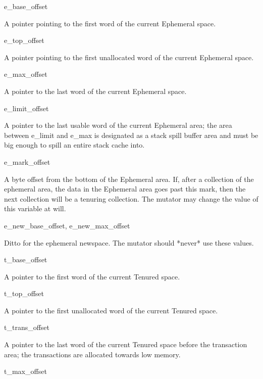 \begin{description}

\item {\sc e\_base\_offset}

A pointer pointing to the first word of the current Ephemeral space.

\item {\sc e\_top\_offset}

A pointer pointing to the first unallocated word of the
current Ephemeral space.

\item {\sc e\_max\_offset}

A pointer to the last word of the current Ephemeral space.

\item {\sc e\_limit\_offset}

A pointer to the last usable word of the current Ephemeral area; the area
between e\_limit and e\_max is designated as a stack spill buffer area and
must be big enough to spill an entire stack cache into.

\item {\sc e\_mark\_offset}

A byte offset from the bottom of the Ephemeral area. If, after a collection
of the ephemeral area, the data in the Ephemeral area goes past this mark,
then the next collection will be a tenuring collection. The mutator may
change the value of this variable at will.

\item {\sc e\_new\_base\_offset, e\_new\_max\_offset }

Ditto for the ephemeral newspace. The mutator should *never* use these values.

\item {\sc t\_base\_offset}

A pointer to the first word of the current Tenured space.

\item {\sc t\_top\_offset}

A pointer to the first unallocated word of the current Tenured space.

\item {\sc t\_trans\_offset}

A pointer to the last word of the current Tenured space
before the transaction area; the transactions are allocated
towards low memory.

\item {\sc t\_max\_offset}


\end{description}
